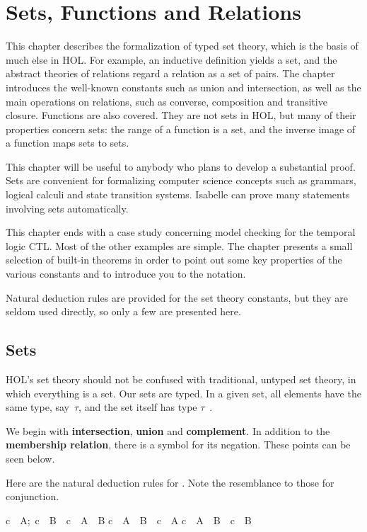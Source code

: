 \chapter{Sets, Functions and Relations}

This chapter describes the formalization of typed set theory, which is
the basis of much else in HOL\@.  For example, an
inductive definition yields a set, and the abstract theories of relations
regard a relation as a set of pairs.  The chapter introduces the well-known
constants such as union and intersection, as well as the main operations on relations, such as converse, composition and
transitive closure.  Functions are also covered.  They are not sets in
HOL, but many of their properties concern sets: the range of a
function is a set, and the inverse image of a function maps sets to sets.

This chapter will be useful to anybody who plans to develop a substantial
proof.  Sets are convenient for formalizing  computer science concepts such
as grammars, logical calculi and state transition systems.  Isabelle can
prove many statements involving sets automatically.

This chapter ends with a case study concerning model checking for the
temporal logic CTL\@.  Most of the other examples are simple.  The
chapter presents a small selection of built-in theorems in order to point
out some key properties of the various constants and to introduce you to
the notation. 

Natural deduction rules are provided for the set theory constants, but they
are seldom used directly, so only a few are presented here.  


\section{Sets}

%
HOL's set theory should not be confused with traditional,  untyped set
theory, in which everything is a set.  Our sets are typed. In a given set,
all elements have the same type, say~$\tau$,  and the set itself has type
$\tau$~. 

We begin with \textbf{intersection}, \textbf{union} and
\textbf{complement}. In addition to the
\textbf{membership relation}, there  is a symbol for its negation. These
points can be seen below.  

Here are the natural deduction rules for .  Note
the  resemblance to those for conjunction.  
\begin{isabelle}
\isasymlbrakk c\ \isasymin\ A;\ c\ \isasymin\ B\isasymrbrakk\ 
\isasymLongrightarrow\ c\ \isasymin\ A\ \isasyminter\ B%
\isanewline
c\ \isasymin\ A\ \isasyminter\ B\ \isasymLongrightarrow\ c\ \isasymin\ A
\rulenamedx{IntD1}\isanewline
c\ \isasymin\ A\ \isasyminter\ B\ \isasymLongrightarrow\ c\ \isasymin\ B
\rulenamedx{IntD2}
\end{isabelle}


